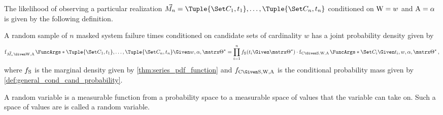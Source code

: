 \documentclass[../main.tex]{subfiles}
\begin{document}
The likelihood of observing a particular realization $\mfs = \Tuple{\cand_1,t_1},\ldots,\Tuple{\cand_n,t_n}$ conditioned on $\mathrm{W} = w$ and $\mathrm{A} = \alpha$ is given by the following definition.
\begin{definition}
	\label{def:msft_joint_pdf}
	A random sample of $n$ masked system failure times conditioned on candidate sets of cardinality $w$ has a joint probability density given by
	\begin{equation}
	\label{eq:msft_joint_pdf}
	\PDF{\Tuple{\cand_1,t_1},\ldots,\Tuple{\cand_n,t_n} \Given w, \alpha, \tparam{\sysparam}}[\mfs \Given \RV{W}, \RV{A}] =
	\prod_{i=1}^{n} \spdf(t_i \Given \tparam\sysparam) \cdot \PDF{\cand_i \Given t_i, w, \alpha, \tparam\sysparam}[\rvcand \Given \sv, \RV{W}, \RV{A}]\,,
	\end{equation}
	where $f_{\mathrm{S}}$ is the marginal density given by \cref{thm:series_pdf_function} and $\pdf_{\rvcand \Given \sv, \RV{W}, \RV{A}}$ is the conditional probability mass given by \cref{def:general_cond_cand_probability}.
\end{definition}


A random variable is a measurable function from a probability space to a measurable space of values that the variable can take on.
Such a space of values are is called a random variable.
\end{document}

